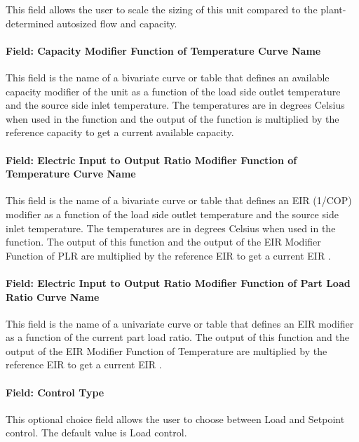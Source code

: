This field allows the user to scale the sizing of this unit compared to the plant-determined autosized flow and capacity.

\paragraph{Field: Capacity Modifier Function of Temperature Curve Name}\label{plhp_eir_cooling_inputs_capft}

This field is the name of a bivariate curve or table that defines an available capacity modifier of the unit as a function of the load side outlet temperature and the source side inlet temperature. The temperatures are in degrees Celsius when used in the function and the output of the function is multiplied by the reference capacity to get a current available capacity.

\paragraph{Field: Electric Input to Output Ratio Modifier Function of Temperature Curve Name}\label{plhp_eir_cooling_inputs_eirft}

This field is the name of a bivariate curve or table that defines an EIR (1/COP) modifier as a function of the load side outlet temperature and the source side inlet temperature. The temperatures are in degrees Celsius when used in the function. The output of this function and the output of the EIR Modifier Function of PLR are multiplied by the reference EIR to get a current EIR .

\paragraph{Field: Electric Input to Output Ratio Modifier Function of Part Load Ratio Curve Name}\label{plhp_eir_cooling_inputs_eirfplr}

This field is the name of a univariate curve or table that defines an EIR modifier as a function of the current part load ratio. The output of this function and the output of the EIR Modifier Function of Temperature are multiplied by the reference EIR to get a current EIR .

\paragraph{Field: Control Type}\label{plhp_eir_cooling_inputs_control_type}

This optional choice field allows the user to choose between Load and Setpoint control. The default value is Load control.

